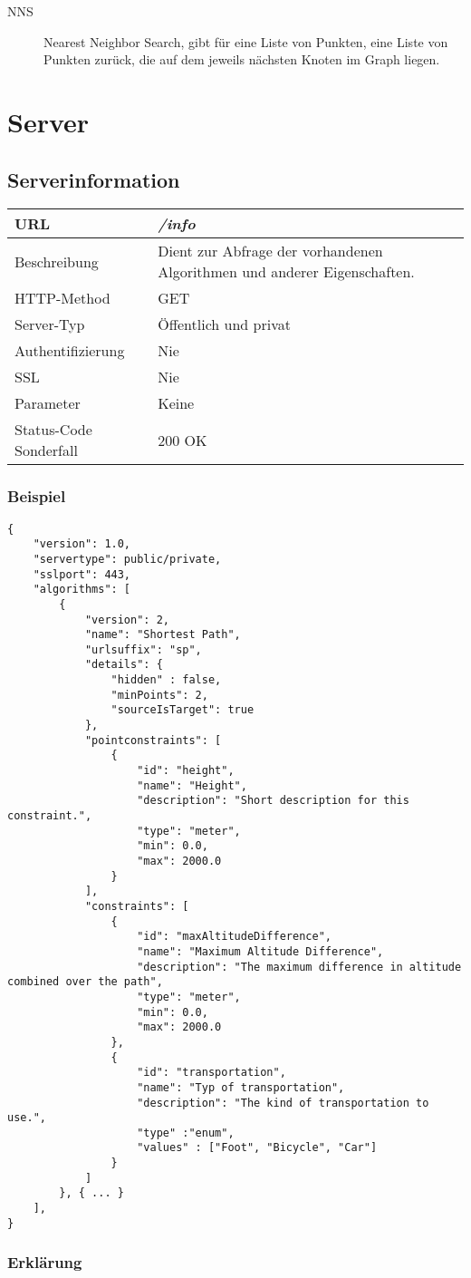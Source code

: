 \documentclass[ngerman,titlepage,parskip=true]{scrartcl}
\newcommand{\requestURL}[1]{\textit{#1}}
\newcommand{\request}[9]
{\subsection{#1}
\begin{tabular}{|p{0.2\textwidth}|p{0.7\textwidth}|}
\hline
  URL & \requestURL{#2}\\\hline
    Beschreibung & #3\\\hline
  HTTP-Method & #4\\\hline
  Server-Typ & #5\\\hline
  Authentifizierung & #6\\\hline
  SSL & #7\\\hline
  Parameter & #8\\\hline
  Status-Code Sonderfall & #9\\\hline
 \end{tabular}\vspace*{1em}}
{}%
{}%
{}%
{}%
{}%
{}%
{}%
{}%
\begin{document}
\begin{description}
\item[NNS] Nearest Neighbor Search, gibt für eine Liste von Punkten, eine Liste von Punkten zurück, die auf dem jeweils nächsten Knoten im Graph liegen.
\end{description}

\clearpage
\section{Server}

\request{Serverinformation}
{/info}
{Dient zur Abfrage der vorhandenen Algorithmen und anderer Eigenschaften.}
{GET}
{Öffentlich und privat}
{Nie}
{Nie}
{Keine}
{200 OK}
\subsubsection{Beispiel}
	
	\begin{lstlisting}
{
    "version": 1.0,
    "servertype": public/private,
    "sslport": 443,
    "algorithms": [
        {
            "version": 2,
            "name": "Shortest Path",
            "urlsuffix": "sp",
            "details": {
                "hidden" : false,
                "minPoints": 2,
                "sourceIsTarget": true 
            },
            "pointconstraints": [                    
                {
                    "id": "height",
                    "name": "Height",
                    "description": "Short description for this constraint.",
                    "type": "meter",
                    "min": 0.0,
                    "max": 2000.0
                }
            ],
            "constraints": [
                {
                    "id": "maxAltitudeDifference",
					"name": "Maximum Altitude Difference",
                    "description": "The maximum difference in altitude combined over the path",
                    "type": "meter",
                    "min": 0.0,
                    "max": 2000.0
                },
                {
                	"id": "transportation",
                	"name": "Typ of transportation",
                	"description": "The kind of transportation to use.",
                	"type" :"enum",
                	"values" : ["Foot", "Bicycle", "Car"]
                }
            ]
        }, { ... }
    ],
}
    \end{lstlisting}
    \subsubsection*{Erklärung}
    
\end{document}
